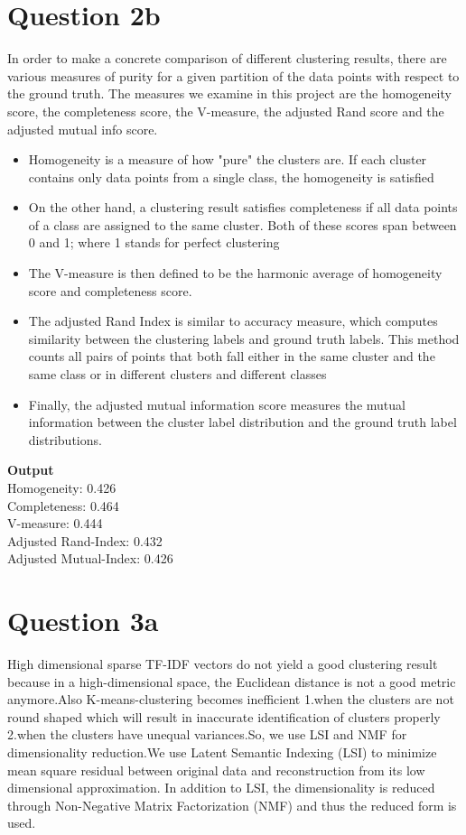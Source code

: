 \documentclass{article}
\begin{document}
\section{Question 2b}
In order to make a concrete comparison of different clustering results, there are various measures of purity for a given partition of the data points with respect to the ground truth. The measures we examine in this project are the homogeneity score, the completeness score, the V-measure, the adjusted Rand score and the adjusted mutual info score.\\
\begin{itemize}
	\item  Homogeneity is a measure of how "pure" the clusters are. If each cluster contains only data points from a single class, the homogeneity is satisfied\\
	\item On the other hand, a clustering result satisfies completeness if all data points of a class are assigned to the same cluster. Both of these scores span between 0 and 1; where 1 stands for perfect clustering\\
	\item The V-measure is then defined to be the harmonic average of homogeneity score and completeness score.
	\item The adjusted Rand Index is similar to accuracy measure, which computes similarity between the clustering labels and ground truth labels. This method counts all pairs of points that both fall either in the same cluster and the same class or in different clusters and different classes\\
	\item Finally, the adjusted mutual information score measures the mutual information between the cluster label distribution and the ground truth label distributions.
\end{itemize}

\textbf{Output}\\
Homogeneity: 0.426 \\
Completeness: 0.464 \\
V-measure: 0.444 \\
Adjusted Rand-Index: 0.432 \\
Adjusted Mutual-Index: 0.426 \\
\section{Question 3a}
High dimensional sparse TF-IDF vectors do not yield a good clustering result because in a high-dimensional space, the Euclidean distance is not a good metric anymore.Also K-means-clustering becomes inefficient 1.when the clusters are not round shaped which will result in inaccurate identification of clusters properly 2.when the clusters have unequal variances.So, we use LSI and NMF for dimensionality reduction.We use Latent Semantic Indexing (LSI) to minimize mean square residual between original data and reconstruction from its low dimensional approximation. In addition to LSI, the dimensionality is reduced through Non-Negative Matrix Factorization (NMF) and thus the reduced form is used.\\
\end{document}
